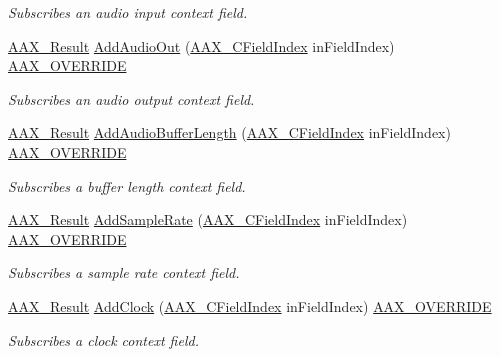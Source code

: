 \begin{DoxyCompactItemize}
\begin{DoxyCompactList}\small\item\em Subscribes an audio input context field. \end{DoxyCompactList}\item 
\mbox{\hyperlink{a00392_a4d8f69a697df7f70c3a8e9b8ee130d2f}{A\+A\+X\+\_\+\+Result}} \mbox{\hyperlink{a01901_a08252ef7dc9aa763fcccfc527583c47f}{Add\+Audio\+Out}} (\mbox{\hyperlink{a00392_ae807f8986143820cfb5d6da32165c9c7}{A\+A\+X\+\_\+\+C\+Field\+Index}} in\+Field\+Index) \mbox{\hyperlink{a00392_ac2f24a5172689ae684344abdcce55463}{A\+A\+X\+\_\+\+O\+V\+E\+R\+R\+I\+DE}}
\begin{DoxyCompactList}\small\item\em Subscribes an audio output context field. \end{DoxyCompactList}\item 
\mbox{\hyperlink{a00392_a4d8f69a697df7f70c3a8e9b8ee130d2f}{A\+A\+X\+\_\+\+Result}} \mbox{\hyperlink{a01901_ae7bc664b4079cb46ca268e983821461d}{Add\+Audio\+Buffer\+Length}} (\mbox{\hyperlink{a00392_ae807f8986143820cfb5d6da32165c9c7}{A\+A\+X\+\_\+\+C\+Field\+Index}} in\+Field\+Index) \mbox{\hyperlink{a00392_ac2f24a5172689ae684344abdcce55463}{A\+A\+X\+\_\+\+O\+V\+E\+R\+R\+I\+DE}}
\begin{DoxyCompactList}\small\item\em Subscribes a buffer length context field. \end{DoxyCompactList}\item 
\mbox{\hyperlink{a00392_a4d8f69a697df7f70c3a8e9b8ee130d2f}{A\+A\+X\+\_\+\+Result}} \mbox{\hyperlink{a01901_a7c69cb309caba10c00e43df147697e98}{Add\+Sample\+Rate}} (\mbox{\hyperlink{a00392_ae807f8986143820cfb5d6da32165c9c7}{A\+A\+X\+\_\+\+C\+Field\+Index}} in\+Field\+Index) \mbox{\hyperlink{a00392_ac2f24a5172689ae684344abdcce55463}{A\+A\+X\+\_\+\+O\+V\+E\+R\+R\+I\+DE}}
\begin{DoxyCompactList}\small\item\em Subscribes a sample rate context field. \end{DoxyCompactList}\item 
\mbox{\hyperlink{a00392_a4d8f69a697df7f70c3a8e9b8ee130d2f}{A\+A\+X\+\_\+\+Result}} \mbox{\hyperlink{a01901_a4da0588e0e1fb6c1b74af10ac525a35e}{Add\+Clock}} (\mbox{\hyperlink{a00392_ae807f8986143820cfb5d6da32165c9c7}{A\+A\+X\+\_\+\+C\+Field\+Index}} in\+Field\+Index) \mbox{\hyperlink{a00392_ac2f24a5172689ae684344abdcce55463}{A\+A\+X\+\_\+\+O\+V\+E\+R\+R\+I\+DE}}
\begin{DoxyCompactList}\small\item\em Subscribes a clock context field. \end{DoxyCompactList}\item 

\end{DoxyCompactItemize}

